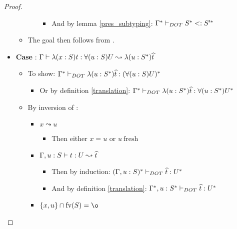 \begin{proof}
\begin{itemize}
\begin{itemize}
\begin{itemize}
\begin{itemize}
                    \item And by lemma \ref{pres_subtyping}:
                        $\Gamma^{*} \vdash_{DOT} S^{*} <: S'^{*}$
                \end{itemize}
            \end{itemize}
            \item The goal then follows from .
        \end{itemize}
        \item \textbf{Case} : $\Gamma \vdash \lambda(x:S)t: \forall(u:S)U \leadsto \lambda(u:S^{*})\widehat{t}$
        \begin{itemize}
            \item To show: $\Gamma^{*} \vdash_{DOT} \lambda(u:S^{*})\widehat{t}: (\forall(u:S)U)^{*}$
            \begin{itemize}
                \item Or by definition \ref{translation}:
                    $\Gamma^{*} \vdash_{DOT} \lambda(u:S^{*})\widehat{t}: \forall(u:S^{*})U^{*}$
            \end{itemize}
            \item By inversion of :
            \begin{itemize}
                \item $x \leadsto u$
                \begin{itemize}
                    \item Then either $x = u$ or $u\ \text{fresh}$
                \end{itemize}
                \item $\Gamma, u: S \vdash t: U \leadsto \widehat{t}$
                \begin{itemize}
                    \item Then by induction:
                        $(\Gamma, u: S)^{*} \vdash_{DOT} \widehat{t}: {U}^{*}$
                    \item And by definition \ref{translation}:
                        $\Gamma^{*}, u: S^{*} \vdash_{DOT} \widehat{t}: {U}^{*}$
                \end{itemize}
                \item $\{x, u\} \cap \FV{S} = \o$
\end{itemize}
\end{itemize}
\end{itemize}
\end{proof}
